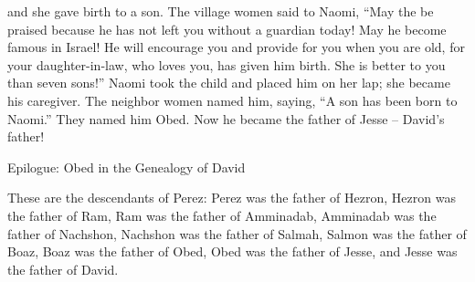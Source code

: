 {and she gave birth
to a son.
The village women
said
to
Naomi,
“May the
{}
be praised
because he has
not
left you without a guardian
today! May he become famous
in Israel!
He will encourage
you and provide
for you when you are old,
for
your daughter-in-law,
who
loves
you, has given him birth.
She is better
to you than seven
sons!”
Naomi
took
the child
and placed
him on her lap;
she became
his caregiver.
The neighbor
women named
him, saying,
“A son
has been born
to Naomi.”
They named
him Obed.
Now he
became the father
of Jesse
– David’s
father!
\par }{\SH Epilogue: Obed in the Genealogy of David
\par }{\PP {}These
are the descendants
of Perez: Perez
was the father
of Hezron,
Hezron
was the father
of Ram,
Ram
was the father
of Amminadab,
Amminadab
was the father
of Nachshon,
Nachshon
was the father
of Salmah,
Salmon
was the father
of Boaz,
Boaz
was the father
of Obed,
Obed
was the father
of Jesse,
and Jesse
was the father
of David.
\par }